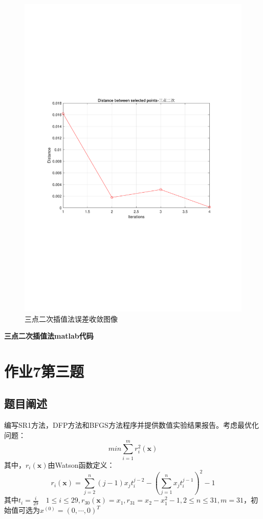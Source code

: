     \begin{figure}[htbp!]
        \centering
        \includegraphics[width = 14cm]{第一题-三点二次.pdf}
        \caption[]{三点二次插值法误差收敛图像}\label{1_3_2}
    \end{figure} 

    \begin{center}
        \textbf{三点二次插值法matlab代码}
    \end{center}

    


    \section{作业7第三题}
    \subsection{题目阐述}
    编写SR1方法，DFP方法和BFGS方法程序并提供数值实验结果报告。考虑最优化问题：
    \[
        min\sum \limits_{i=1}^m r_i^2(\bm{x}) 
    \] 
    其中，$ r_i(\bm{x}) $由Watson函数定义：
    \[
        r_i(\bm{x}) = \sum \limits_{j=2}^n(j-1)x_jt_i^{j-2}-(\sum\limits_{j=1}^n 
        x_jt_i^{j-1} )^2-1  
    \]  
    其中$ t_i = \frac{i}{29} \quad 1\leq i\leq 29, r_{30}(\bm{x}) = x_1, r_{31} = x_2-x_1^2-1, 2\leq n
    \leq 31,m =31 $，初始值可选为$ x^{(0)} = (0,\cdots,0)^T  $  


